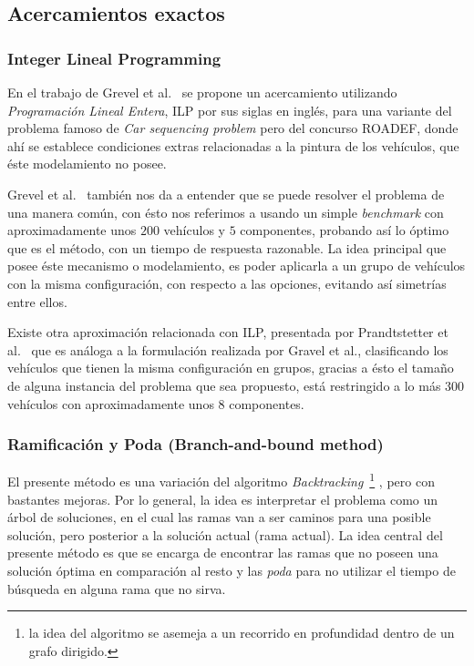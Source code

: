 \subsection{Acercamientos exactos}
\subsubsection{Integer Lineal Programming}
En el trabajo de Grevel et al.~\cite{4} se propone un acercamiento utilizando
\emph{Programación Lineal Entera}, ILP por sus siglas en inglés,  para una variante
del problema famoso de \emph{Car sequencing problem} pero del concurso ROADEF,
donde ahí se establece condiciones extras relacionadas a la pintura de los vehículos,
que éste modelamiento no posee.

Grevel et al.~\cite{4} también nos da a entender que se puede resolver el problema
de una manera común, con ésto nos referimos a usando un simple \emph{benchmark}
con aproximadamente unos $200$ vehículos y $5$ componentes, probando así
lo óptimo que es el método, con un tiempo de respuesta razonable.
La idea principal que posee éste mecanismo o modelamiento, es poder aplicarla a un
grupo de vehículos con la misma configuración, con respecto a las opciones,
evitando así simetrías entre ellos.

Existe otra aproximación relacionada con ILP, presentada por Prandtstetter et al.~\cite{12}
que es análoga a la formulación realizada por Gravel et al., clasificando los vehículos
que tienen la misma configuración en grupos, gracias a ésto el tamaño de alguna instancia
del problema que sea propuesto, está restringido a lo más $300$ vehículos con aproximadamente
unos $8$ componentes.

\subsubsection{Ramificación y Poda (Branch-and-bound method)}

El presente método es una variación del algoritmo \emph{Backtracking}~\footnote{
la idea del algoritmo se asemeja a un recorrido en profundidad dentro de un grafo dirigido.
}
, pero con bastantes mejoras.
Por lo general, la idea es interpretar el problema como un árbol de soluciones,
en el cual las ramas van a ser caminos para una posible solución, pero posterior a la solución
actual (rama actual).
La idea central del presente método es que se encarga de encontrar las ramas que no poseen
una solución óptima en comparación al resto y las \emph{poda} para no utilizar el tiempo
de búsqueda en alguna rama que no sirva.

